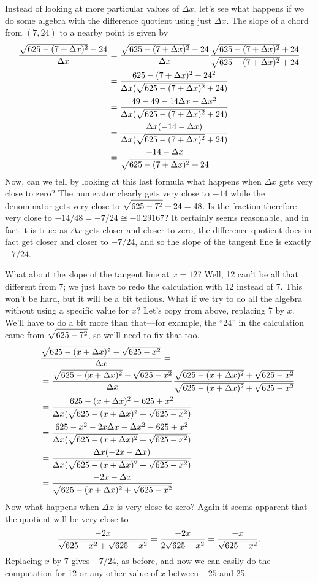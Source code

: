 Instead of looking at more particular values of $\Delta x$, let's see
what happens if we do some algebra with the difference quotient using
just $\Delta x$. The slope of a chord from $(7,24)$ to a nearby point
is given by
\begin{align*}
{\sqrt{625-(7+\Delta x)^2} - 24\over \Delta x}&=
{\sqrt{625-(7+\Delta x)^2} - 24\over \Delta x}{\sqrt{625-(7+\Delta
    x)^2}+24\over \sqrt{625-(7+\Delta x)^2}+24} \\
&={625-(7+\Delta x)^2-24^2\over \Delta x(\sqrt{625-(7+\Delta x)^2}+24)} \\
&={49-49-14\Delta x-\Delta x^2\over  \Delta x(\sqrt{625-(7+\Delta
    x)^2}+24)} \\
&={\Delta x(-14-\Delta x)\over \Delta x(\sqrt{625-(7+\Delta
    x)^2}+24)} \\
&= {-14-\Delta x\over\sqrt{625-(7+\Delta
    x)^2}+24} \\
\end{align*}
Now, can we tell by looking at this last formula what happens when
$\Delta x$ gets very close to zero? The numerator clearly gets very
close to $-14$ while the denominator gets very close to
$\displaystyle \sqrt{625-7^2}+24=48$. Is the fraction therefore very close to 
$-14/48 = -7/24 \cong -0.29167$? It certainly seems reasonable, and in
fact it is true: as $\Delta x$ gets closer and closer to zero, the
difference quotient does in fact get closer and closer to $-7/24$, and
so the slope of the tangent line is exactly $-7/24$.

What about the slope of the tangent line at $x=12$? Well, 12 can't be
all that different from 7; we just have to redo the calculation with
12 instead of 7. This won't be hard, but it will be a bit
tedious. What if we try to do all the algebra without using a specific
value for $x$? Let's copy from above, replacing 7 by  $x$. We'll have
to do a bit more than that---for example, 
the ``24'' in the calculation came from 
$\displaystyle \sqrt{625-7^2}$, so we'll need to fix that too.
\begin{align*}
&{\sqrt{625-(x+\Delta x)^2} - \sqrt{625-x^2}\over \Delta x}= \\
\qquad&={\sqrt{625-(x+\Delta x)^2} - \sqrt{625-x^2}\over \Delta x}{\sqrt{625-(x+\Delta
    x)^2}+\sqrt{625-x^2}\over \sqrt{625-(x+\Delta x)^2}+\sqrt{625-x^2}} \\
&={625-(x+\Delta x)^2-625+x^2\over \Delta x(\sqrt{625-(x+\Delta x)^2}+\sqrt{625-x^2})} \\
&={625-x^2-2x\Delta x-\Delta x^2-625+x^2\over  \Delta x(\sqrt{625-(x+\Delta
    x)^2}+\sqrt{625-x^2})} \\
&={\Delta x(-2x-\Delta x)\over \Delta x(\sqrt{625-(x+\Delta
    x)^2}+\sqrt{625-x^2})} \\
&= {-2x-\Delta x\over\sqrt{625-(x+\Delta
    x)^2}+\sqrt{625-x^2}} \\
\end{align*}
Now what happens when $\Delta x$ is very close to zero? Again it seems
apparent that the quotient will be very close to
$${-2x\over \sqrt{625-x^2}+\sqrt{625-x^2}}
={-2x\over 2\sqrt{625-x^2}}={-x\over \sqrt{625-x^2}}.
$$
Replacing $x$ by 7 gives $-7/24$, as before, and now we can easily do
the computation for 12  or any other value of
$x$ between $-25$ and 25.

